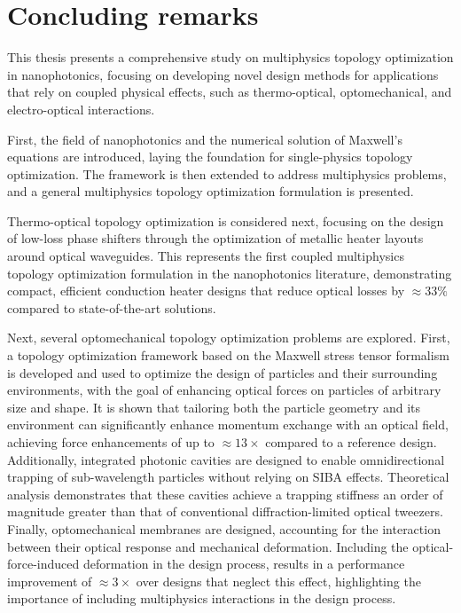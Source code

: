 \chapter{Concluding remarks}

This thesis presents a comprehensive study on multiphysics topology optimization in nanophotonics, focusing on developing novel design
methods for applications that rely on coupled physical effects, such as thermo-optical, optomechanical, and electro-optical interactions.

First, the field of nanophotonics and the numerical solution of Maxwell's equations are introduced, laying the foundation for single-physics topology optimization. The framework is then extended to address multiphysics
problems, and a general multiphysics topology optimization formulation is presented.

Thermo-optical topology optimization is considered next, focusing on the design of low-loss phase shifters through the optimization of metallic heater layouts around optical waveguides. This represents the first coupled multiphysics topology optimization formulation
in the nanophotonics literature, demonstrating compact, efficient conduction heater designs that reduce optical losses by
$\approx 33\%$ compared to state-of-the-art solutions.

Next, several optomechanical topology optimization problems are explored. First, a topology optimization framework based on the Maxwell stress tensor formalism is developed and used to optimize the design of particles and their surrounding environments, with the goal of enhancing optical forces on particles of arbitrary size and shape.
It is shown that tailoring both the particle geometry and its
environment can significantly enhance momentum exchange with an optical field, achieving force enhancements of up to
$\approx 13\times$ compared to a reference design. Additionally, integrated photonic cavities are designed to enable omnidirectional trapping of sub-wavelength particles without relying on SIBA effects. Theoretical analysis demonstrates that these cavities achieve a trapping stiffness an order of magnitude greater than that of conventional diffraction-limited optical tweezers. Finally, optomechanical membranes are designed, accounting for the interaction between their optical response and mechanical deformation. Including the
optical-force-induced deformation in the design process, results in a performance improvement of $\approx 3\times$ over designs that
neglect this effect, highlighting the importance of including multiphysics interactions in the design process.

